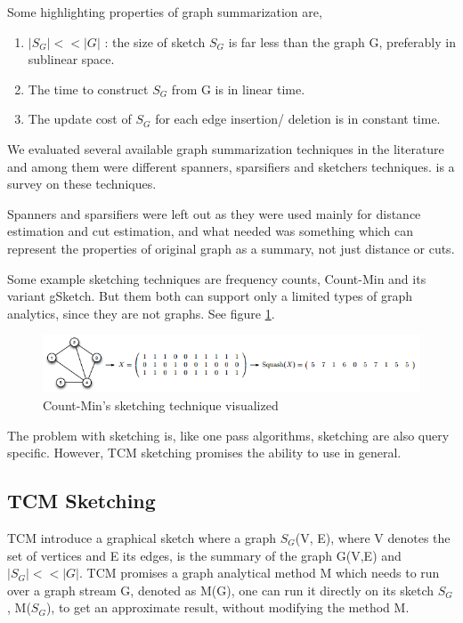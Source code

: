 \documentclass[conference]{IEEEtran}
\begin{document}
Some highlighting properties of graph summarization are, 

\begin{enumerate}

\item $ | S_G | << | G |$ : the size of sketch $S_G$ is far less than the graph G, preferably in sublinear space.
\item The time to construct $S_G$ from G is in linear time.
\item The update cost of $S_G$ for each edge insertion/ deletion is in constant time.

\end{enumerate}


We evaluated several available graph summarization techniques in the literature and among them were different spanners\cite{sparse spanners}, sparsifiers\cite{Spectral sparsification}  and sketchers techniques. \cite{Graph stream algorithms survey} is a survey on these techniques.


Spanners and sparsifiers were left out as they were used mainly for distance estimation and cut estimation, and what needed was something which can represent the properties of original graph as a summary, not just distance or cuts.


Some example sketching techniques are frequency counts\cite{frequency counts}, Count-Min\cite{CountMin} and its variant gSketch\cite{gSketch}. But them both can support only a limited types of graph analytics, since they are not graphs. See figure \ref{fig:Count-Min}.

\begin{figure}[!b]
\centering
\includegraphics[width=\linewidth]{image15}
\caption{Count-Min's sketching technique visualized}
\label{fig:Count-Min}
\end{figure}


The problem with sketching is, like one pass algorithms, sketching are also query specific. However, TCM sketching promises the ability to use in general. 


\subsection{TCM Sketching}

TCM\cite{TCM} introduce a graphical sketch where a graph $S_G$(V, E), where V denotes the set of vertices and E its edges, is the summary of the graph G(V,E) and $|S_G| << |G|$. TCM promises a graph analytical method M which needs to run over a graph stream G, denoted as M(G), one can run it directly on its sketch $S_G$, M($S_G$), to get an approximate result, without modifying the method M.
\end{document}
